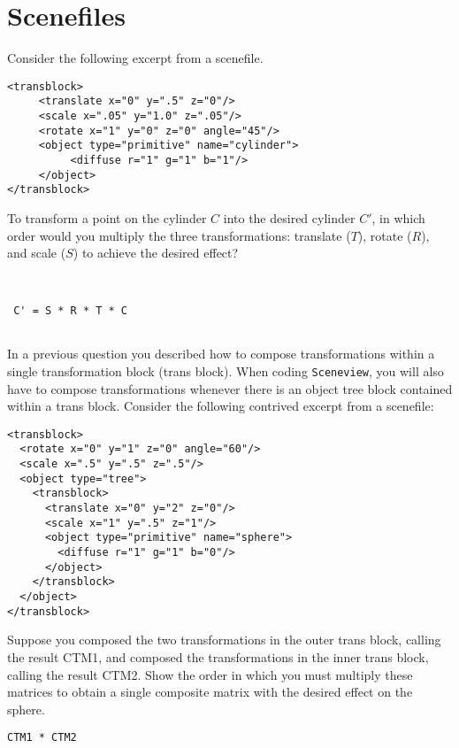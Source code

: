 \documentclass[10pt,twocolumn]{article}
\begin{document}
\section{Scenefiles}
Consider the following excerpt from a scenefile.
\begin{verbatim}
<transblock>
     <translate x="0" y=".5" z="0"/>
     <scale x=".05" y="1.0" z=".05"/>
     <rotate x="1" y="0" z="0" angle="45"/>
     <object type="primitive" name="cylinder">
          <diffuse r="1" g="1" b="1"/> 
     </object>
</transblock>
\end{verbatim}

\begin{framed}
  To transform a point on the cylinder $C$ into the desired cylinder $C'$, in which order would you multiply the three transformations: translate ($T$), rotate ($R$), and scale ($S$) to achieve the desired effect?
\begin{verbatim}


 C' = S * R * T * C
 
\end{verbatim} 
\end{framed}

\noindent In a previous question you described how to compose transformations within a single transformation block (trans block). When coding {\tt Sceneview}, you will also have to compose transformations whenever there is an object tree block contained within a trans block. Consider the following contrived excerpt from a scenefile:
\begin{verbatim}
<transblock>
  <rotate x="0" y="1" z="0" angle="60"/> 
  <scale x=".5" y=".5" z=".5"/>
  <object type="tree">
    <transblock>
      <translate x="0" y="2" z="0"/>
      <scale x="1" y=".5" z="1"/>
      <object type="primitive" name="sphere">
        <diffuse r="1" g="1" b="0"/> 
      </object>
    </transblock> 
  </object>
</transblock>
\end{verbatim}

\begin{framed}
  Suppose you composed the two transformations in the outer trans block, calling the result CTM1, and composed the transformations in the inner trans block, calling the result CTM2. Show the order in which you must multiply these matrices to obtain a single composite matrix with the desired effect on the sphere.
\end{framed}

\begin{framed}
\begin{verbatim}
CTM1 * CTM2
\end{verbatim}
\end{framed}
\end{document}
